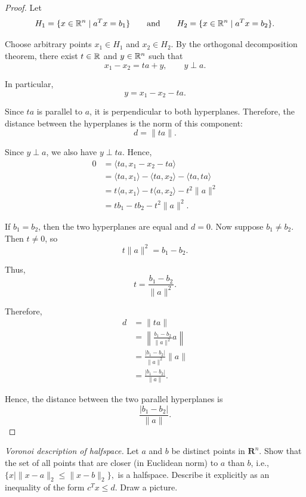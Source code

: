 \documentclass[12pt]{book}
\begin{document}
\begin{proof}
    Let
    \[
        H_1=\{x\in\mathbb{R}^n\mid a^Tx=b_1\}
        \qquad\text{and}\qquad
        H_2=\{x\in\mathbb{R}^n\mid a^Tx=b_2\}.
    \]

    Choose arbitrary points $x_1\in H_1$ and $x_2\in H_2$. By the
    orthogonal decomposition theorem, there exist $t\in\mathbb{R}$ and
    $y\in\mathbb{R}^n$ such that
    \[
        x_1-x_2=ta+y,
        \qquad y\perp a.
    \]

    In particular,
    \[
        y=x_1-x_2-ta.
    \]

    Since $ta$ is parallel to $a$, it is perpendicular to both
    hyperplanes. Therefore, the distance between the hyperplanes is
    the norm of this component:
    \[
        d=\|ta\|.
    \]

    Since $y\perp a$, we also have $y\perp ta$. Hence,
    \[
    \begin{aligned}
        0
        &=\langle ta,x_1-x_2-ta\rangle \\
        &=\langle ta,x_1\rangle
          -\langle ta,x_2\rangle
          -\langle ta,ta\rangle \\
        &=t\langle a,x_1\rangle
          -t\langle a,x_2\rangle
          -t^2\|a\|^2 \\
        &=tb_1-tb_2-t^2\|a\|^2.
    \end{aligned}
    \]

    If $b_1=b_2$, then the two hyperplanes are equal and $d=0$.
    Now suppose $b_1\neq b_2$. Then $t\neq0$, so
    \[
        t\|a\|^2=b_1-b_2.
    \]

    Thus,
    \[
        t=\frac{b_1-b_2}{\|a\|^2}.
    \]

    Therefore,
    \[
    \begin{aligned}
        d
        &=\|ta\| \\
        &=\left\|
            \frac{b_1-b_2}{\|a\|^2}a
        \right\| \\
        &=\frac{|b_1-b_2|}{\|a\|^2}\|a\| \\
        &=\frac{|b_1-b_2|}{\|a\|}.
    \end{aligned}
    \]

    Hence, the distance between the two parallel hyperplanes is
    \[
        \frac{|b_1-b_2|}{\|a\|}.
    \]
\end{proof}


\newpage


\begin{exercise}
    \textit{Voronoi description of halfspace.} Let $a$ and $b$ be distinct points in $\mathbf{R}^n$. Show that the set of all points that are closer (in Euclidean norm) to $a$ than $b$, i.e.,
        $
        \{x \mid \|x - a\|_2 \leq \|x - b\|_2\},
        $
    is a halfspace. Describe it explicitly as an inequality of the form $c^T x \leq d$. Draw a picture.
\end{exercise}
\end{document}
